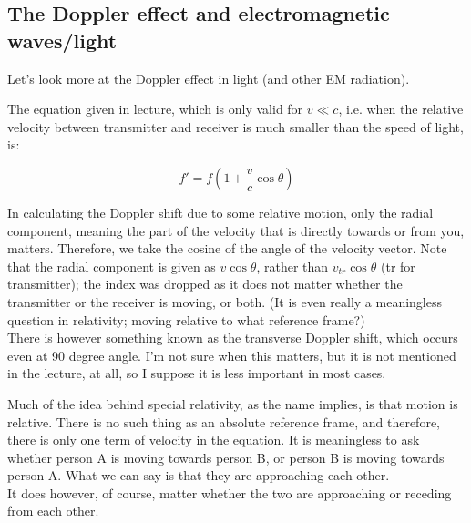 \subsection{The Doppler effect and electromagnetic waves/light}

Let's look more at the Doppler effect in light (and other EM radiation).

\begin{figure}[H]
  \centering
\end{figure}
 

The equation given in lecture, which is only valid for $v \ll c$, i.e. when the relative velocity between transmitter and receiver is much smaller than the speed of light, is:

\begin{equation}
f' = f (1 + \frac{v}{c} \cos \theta)
\end{equation}

In calculating the Doppler shift due to some relative motion, only the radial component, meaning the part of the velocity that is directly towards or from you, matters. Therefore, we take the cosine of the angle of the velocity vector. Note that the radial component is given as $v \cos \theta$, rather than $v_{tr} \cos \theta$ (tr for transmitter); the index was dropped as it does not matter whether the transmitter or the receiver is moving, or both. (It is even really a meaningless question in relativity; moving relative to what reference frame?)\\
There is however something known as the transverse Doppler shift, which occurs even at 90 degree angle. I'm not sure when this matters, but it is not mentioned in the lecture, at all, so I suppose it is less important in most cases.

Much of the idea behind special relativity, as the name implies, is that motion is relative. There is no such thing as an absolute reference frame, and therefore, there is only one term of velocity in the equation. It is meaningless to ask whether person A is moving towards person B, or person B is moving towards person A. What we can say is that they are approaching each other.\\
It does however, of course, matter whether the two are approaching or receding from each other.

